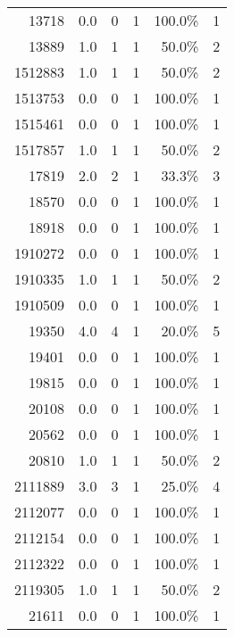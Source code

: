 \begin{longtable}{lrrrrr}
	    \multicolumn{1}{r}{13718} & 0.0   & 0     & 1     & 100.0\% & 1 \\
	    \multicolumn{1}{r}{13889} & 1.0   & 1     & 1     & 50.0\% & 2 \\
	    \multicolumn{1}{r}{1512883} & 1.0   & 1     & 1     & 50.0\% & 2 \\
	    \multicolumn{1}{r}{1513753} & 0.0   & 0     & 1     & 100.0\% & 1 \\
	    \multicolumn{1}{r}{1515461} & 0.0   & 0     & 1     & 100.0\% & 1 \\
	    \multicolumn{1}{r}{1517857} & 1.0   & 1     & 1     & 50.0\% & 2 \\
	    \multicolumn{1}{r}{17819} & 2.0   & 2     & 1     & 33.3\% & 3 \\
	    \multicolumn{1}{r}{18570} & 0.0   & 0     & 1     & 100.0\% & 1 \\
	    \multicolumn{1}{r}{18918} & 0.0   & 0     & 1     & 100.0\% & 1 \\
	    \multicolumn{1}{r}{1910272} & 0.0   & 0     & 1     & 100.0\% & 1 \\
	    \multicolumn{1}{r}{1910335} & 1.0   & 1     & 1     & 50.0\% & 2 \\
	    \multicolumn{1}{r}{1910509} & 0.0   & 0     & 1     & 100.0\% & 1 \\
	    \multicolumn{1}{r}{19350} & 4.0   & 4     & 1     & 20.0\% & 5 \\
	    \multicolumn{1}{r}{19401} & 0.0   & 0     & 1     & 100.0\% & 1 \\
	    \multicolumn{1}{r}{19815} & 0.0   & 0     & 1     & 100.0\% & 1 \\
	    \multicolumn{1}{r}{20108} & 0.0   & 0     & 1     & 100.0\% & 1 \\
	    \multicolumn{1}{r}{20562} & 0.0   & 0     & 1     & 100.0\% & 1 \\
	    \multicolumn{1}{r}{20810} & 1.0   & 1     & 1     & 50.0\% & 2 \\
	    \multicolumn{1}{r}{2111889} & 3.0   & 3     & 1     & 25.0\% & 4 \\
	    \multicolumn{1}{r}{2112077} & 0.0   & 0     & 1     & 100.0\% & 1 \\
	    \multicolumn{1}{r}{2112154} & 0.0   & 0     & 1     & 100.0\% & 1 \\
	    \multicolumn{1}{r}{2112322} & 0.0   & 0     & 1     & 100.0\% & 1 \\
	    \multicolumn{1}{r}{2119305} & 1.0   & 1     & 1     & 50.0\% & 2 \\
	    \multicolumn{1}{r}{21611} & 0.0   & 0     & 1     & 100.0\% & 1 \\

\end{longtable}
